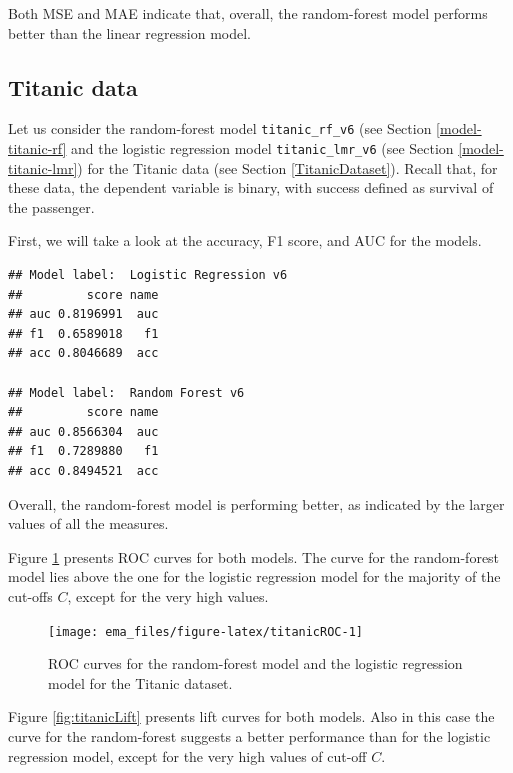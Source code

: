 \documentclass[]{krantz}
\begin{document}
Both MSE and MAE indicate that, overall, the random-forest model performs better than the linear regression model.

\hypertarget{modelPerformanceTitanic}{%
\subsection{Titanic data}\label{modelPerformanceTitanic}}

Let us consider the random-forest model \texttt{titanic\_rf\_v6} (see Section \ref{model-titanic-rf} and the logistic regression model \texttt{titanic\_lmr\_v6} (see Section \ref{model-titanic-lmr}) for the Titanic data (see Section \ref{TitanicDataset}). Recall that, for these data, the dependent variable is binary, with success defined as survival of the passenger.

First, we will take a look at the accuracy, F1 score, and AUC for the models.

\begin{verbatim}
## Model label:  Logistic Regression v6 
##         score name
## auc 0.8196991  auc
## f1  0.6589018   f1
## acc 0.8046689  acc

## Model label:  Random Forest v6 
##         score name
## auc 0.8566304  auc
## f1  0.7289880   f1
## acc 0.8494521  acc
\end{verbatim}

Overall, the random-forest model is performing better, as indicated by the larger values of all the measures.

Figure \ref{fig:titanicROC} presents ROC curves for both models. The curve for the random-forest model lies above the one for the logistic regression model for the majority of the cut-offs \(C\), except for the very high values.

\begin{figure}

{\centering \texttt{[image: ema\_files/figure-latex/titanicROC-1]} 

}

\caption{ROC curves for the  random-forest model and the logistic regression model for the Titanic dataset.}\label{fig:titanicROC}
\end{figure}

Figure \ref{fig:titanicLift} presents lift curves for both models. Also in this case the curve for the random-forest suggests a better performance than for the logistic regression model, except for the very high values of cut-off \(C\).
\end{document}

